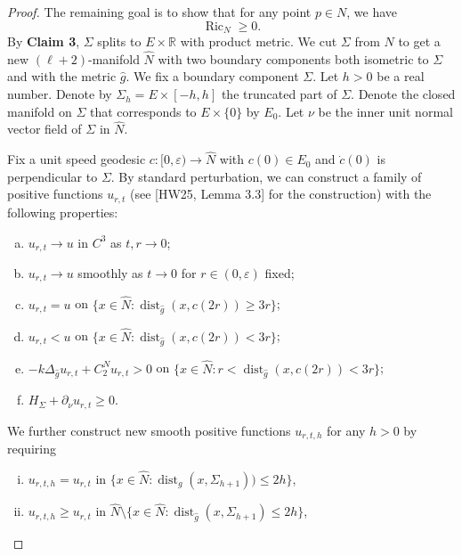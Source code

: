 \documentclass[11pt,letterpaper]{amsart}
\DeclareMathOperator{\Ric}{Ric}
\theoremstyle{definition}
\theoremstyle{remark}
\numberwithin{equation}{section}
\begin{document}
\begin{proof}
     

The remaining goal is to show that for any point $p\in N$, we have
\[\Ric_N\geq 0.\]
    By \textbf{Claim 3}, $\Sigma$ splits to $E\times \mathbb{R}$ with product metric. We cut $\Sigma$ from $N$ to get a new $(\ell+2)$-manifold $\hat{N}$ with two boundary components both isometric to $\Sigma$ and with the metric $\hat{g}$.  We fix a boundary component $\Sigma$. Let $h > 0$ be a real number. Denote by $\Sigma_h = E \times [-h, h]$ the truncated part of $\Sigma$. Denote the closed manifold on $\Sigma$ that corresponds to $E\times \{0\}$ by $E_0$. Let $\nu$ be the inner unit normal vector field of $\Sigma$ in $\hat{N}.$
    
    Fix a unit speed geodesic $c:[0,\varepsilon)\rightarrow \hat{N}$ with $c(0)\in E_0$ and $\dot{c}(0)$ is perpendicular to $\Sigma$. By standard perturbation, we can construct a family of positive functions \( u_{r,t} \) (see [HW25, Lemma 3.3] for the construction) with the following properties:
\begin{enumerate}[(a)]
\item \( u_{r,t} \to u \) in \( C^3 \) as \( t, r \to 0 \);
\item \( u_{r,t} \to u \) smoothly as \( t \to 0 \) for \( r \in (0, \varepsilon) \) fixed;
\item \( u_{r,t} = u \) on \( \{ x \in \hat{N} : \operatorname{dist}_{\hat{g}}(x, c(2r)) \ge 3r \} \);
\item \( u_{r,t} < u \) on \( \{ x \in \hat{N} : \operatorname{dist}_{\hat{g}}(x, c(2r)) < 3r \} \);
\item \( -k\Delta_{\hat{g}} u_{r,t} +  C_2^N u_{r,t} > 0 \) on \( \{ x \in \hat{N} : r < \operatorname{dist}_{\hat{g}}(x, c(2r)) < 3r \} \);
\item \( H_\Sigma+\partial_\nu u_{r,t} \ge 0 \).
\end{enumerate}
We further construct new smooth positive functions \( u_{r,t,h} \) for any \( h > 0 \) by requiring

\begin{enumerate}[(i)]
\item \( u_{r,t,h} = u_{r,t} \) in \( \{ x \in \hat{N} : \operatorname{dist}_g(x, \Sigma_{h+1})) \leq 2h \} \),

\item \( u_{r,t,h} \geq u_{r,t} \) in \( \hat{N} \setminus \{ x \in \hat{N} : \operatorname{dist}_{\hat{g}}(x, \Sigma_{h+1}) \leq 2h \} \),


\end{enumerate}
\end{proof}
\end{document}

